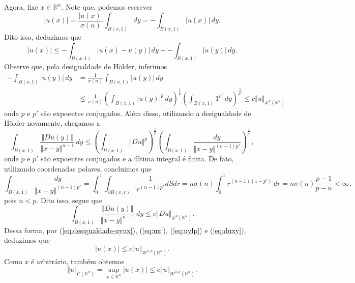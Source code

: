 \documentclass[a4paper, 11pt]{book}
\theoremstyle{definition}
\newcommand{\bR}{\mathbb{R}}
\newcommand{\cC}{\mathcal{C}}
\newcommand{\cL}{\mathcal{L}}
\newcommand{\cW}{\mathcal{W}}
\newcommand{\sint}{-\!\!\!\!\!\!\int}
\begin{document}
\begin{prf}
    Agora, fixe $x \in \bR^n$. Note que, podemos escrever
    \[
        |u(x)| = \frac{|u(x)|}{\sigma(n)}\int_{B(x,1)} dy = \sint_{B(x,1)} |u(x)| \,dy.
    \]
    Dito isso, deduzimos que
    \begin{equation} \label{eq:ux}
        |u(x)| \leqslant \sint_{B(x,1)} |u(x) - u(y)| \,dy + \sint_{B(x,1)} |u(y)|\,dy.
    \end{equation}
    Observe que, pela desigualdade de Hölder, inferimos
    \begin{equation} \label{eq:uylp}
        \begin{aligned}
            \sint_{B(x,1)} |u(y)| \,dy &= \frac{1}{\sigma(n)} \int_{B(x,1)} |u(y)| \,dy\\ 
            &\leqslant \frac{1}{\sigma(n)} \left( \int_{B(x,1)} |u(y)|^p\,dy \right)^{\frac{1}{p}} \left( \int_{B(x,1)} 1^{p'} \,dy \right)^{\frac{1}{p'}} \leqslant c \Vert u \Vert_{\cL^p(\bR^n)}
        \end{aligned}
    \end{equation}
    onde $p$ e $p'$ são expoentes conjugados.
    Além disso, utilizando a desigualdade de Hölder novamente, chegamos a
    \[
        \int_{B(x,1)} \frac{\Vert Du(y) \Vert}{\Vert x - y \Vert^{n-1}} \,dy \leqslant \left( \int_{B(x,1)} \Vert Du \Vert^p \right)^{\frac{1}{p}} \left( \int_{B(x,1)} \frac{dy}{\Vert x - y \Vert^{(n-1)p'}} \right)^{\frac{1}{p'}},
    \]
    onde $p$ e $p'$ são expoentes conjugados e a última integral é finita.
    De fato, utliizando coordenadas polares, concluimos que
    \[
        \int_{B(x,1)} \frac{dy}{\Vert x - y \Vert^{(n-1)p'}} = \int_0^1 \int_{\partial B(x,r)} \frac{1}{r^{(n-1)p'}} dSdr = n\sigma(n)\int_0^1 r^{(n-1)(1-p')} \,dr = n \sigma(n)  \frac{p-1}{p-n} < \infty,
    \]
    pois $n < p$.
    Dito isso, segue que
    \begin{equation} \label{eq:duxy}
        \int_{B(x,1)} \frac{\Vert Du(y) \Vert}{\Vert x - y \Vert^{n-1}} \,dy \leqslant c\Vert Du \Vert_{\cL^p(\bR^n)}.
    \end{equation}
    Dessa forma, por (\ref{eq:desigualdade-uyux}), (\ref{eq:ux}), (\ref{eq:uylp}) e (\ref{eq:duxy}), deduzimos que
    \[
        |u(x)| \leqslant c \Vert u \Vert_{\cW^{1,p}(\bR^n)}.
    \]
    Como $x$ é arbitrário, também obtemos
    \begin{equation} \label{eq:normac}
        \Vert u \Vert_{\cC(\bR^n)} = \sup_{x \in \bR^n} |u(x)| \leqslant c \Vert u \Vert_{\cW^{1,p}(\bR^n)}.
    \end{equation}


\end{prf}
\end{document}
